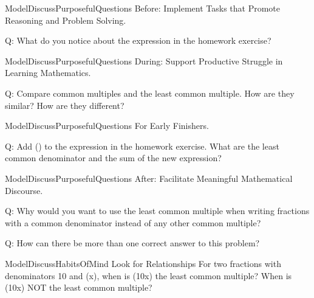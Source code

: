 \documentclass{article}
\newenvironment{te-addendum}[2]{}{}
\newcommand{\answer}[1]{}
\begin{document}
\begin{te-addendum}{ModelDiscuss}{PurposefulQuestions}
Before: Implement Tasks that Promote Reasoning and Problem Solving.

Q: What do you notice about the expression in the homework exercise?
\answer{Three fractions are added. The numerator of each fraction is 1. Each fraction has a different denominator.}
\end{te-addendum}

\begin{te-addendum}{ModelDiscuss}{PurposefulQuestions}
During: Support Productive Struggle in Learning Mathematics.

Q: Compare common multiples and the least common multiple. How are they similar? How are they different?
\answer{The least common multiple is a common multiple. The common multiples of a group of numbers are multiples of each number in the group. A group of numbers has many common multiples, but only one least common multiple.}
\end{te-addendum}

\begin{te-addendum}{ModelDiscuss}{PurposefulQuestions}
For Early Finishers.

Q: Add () to the expression in the homework exercise. What are the least common denominator and the sum of the new expression?
\answer{72; (\frac{77}{72})}
\end{te-addendum}

\begin{te-addendum}{ModelDiscuss}{PurposefulQuestions}
After: Facilitate Meaningful Mathematical Discourse.

Q: Why would you want to use the least common multiple when writing fractions with a common denominator instead of any other common multiple?
\answer{The least common multiple gives you smaller numbers to compute.}

Q: How can there be more than one correct answer to this problem?
\answer{You can write the answer with different equivalent fractions. All of these answers to the homework exercise are equivalent: (\frac{17}{18}), (\frac{34}{36}), (\frac{51}{54}), and (\frac{68}{72}).}
\end{te-addendum}

\begin{te-addendum}{ModelDiscuss}{HabitsOfMind}
Look for Relationships For two fractions with denominators 10 and (x), when is (10x) the least common multiple? When is (10x) NOT the least common multiple?
\answer{When (x) and 10 have no common factors, (10x) is the least common multiple; when (x) and 10 have common factors, (10x) is not the least common multiple.}
\end{te-addendum}
\end{document}
